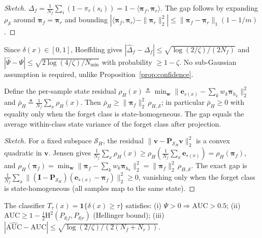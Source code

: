 \documentclass[smallextended]{svjour3}       %
\newcommand{\coloneqq}{\triangleq}
\begin{document}
\begin{proof}[Sketch]
$\Delta_f=\frac1{N_f}\sum_i(1-\pi_r(s_i))=1-\langle\boldsymbol{\pi}_f,\boldsymbol{\pi}_r\rangle$. The gap follows by expanding $\rho_{\mathcal{S}}$ around $\boldsymbol{\pi}_f=\boldsymbol{\pi}_r$ and bounding $|\langle\boldsymbol{\pi}_f,\boldsymbol{\pi}_r\rangle-\|\boldsymbol{\pi}_r\|_2^2|\le\|\boldsymbol{\pi}_f-\boldsymbol{\pi}_r\|_1(1-1/m)$.
\end{proof}

\begin{proposition}
\label{prop:pssd_conc}
Since $\delta(x)\in[0,1]$, Hoeffding gives $|\hat{\Delta}_f-\Delta_f|\le\sqrt{\log(2/\zeta)/(2N_f)}$ and $|\hat{\Psi}-\Psi|\le\sqrt{2\log(4/\zeta)/N_{\min}}$ with probability $\ge1-\zeta$. No sub-Gaussian assumption is required, unlike Proposition~\ref{prop:confidence}.
\end{proposition}

\begin{proposition}
\label{prop:ps_mhpr}
Define the per-sample state residual $\rho_H(x)\coloneqq\min_{\mathbf{w}}\|\mathbf{e}_{s(x)}-\sum_k w_k\boldsymbol{\pi}_{h_k}\|_2^2$ and $\bar{\rho}_H\coloneqq\frac1{N_f}\sum_x\rho_H(x)$. Then $\bar{\rho}_H \ge \|\boldsymbol{\pi}_f\|_2^2\,\rho_{H,\mathcal{S}}$; in particular $\bar{\rho}_H\ge0$ with equality only when the forget class is state-homogeneous. The gap equals the average within-class state variance of the forget class after projection.
\end{proposition}

\begin{proof}[Sketch]
For a fixed subspace $\mathcal{S}_H$, the residual $\|\mathbf{v}-\mathbf{P}_{\mathcal{S}_H}\mathbf{v}\|_2^2$ is a convex quadratic in $\mathbf{v}$. Jensen gives $\frac1{N_f}\sum_x\rho_H(x)\ge\rho_H(\frac1{N_f}\sum_x\mathbf{e}_{s(x)})=\rho_H(\boldsymbol{\pi}_f)$, and $\rho_H(\boldsymbol{\pi}_f)=\min_{\mathbf{w}}\|\boldsymbol{\pi}_f-\sum_k w_k\boldsymbol{\pi}_{h_k}\|_2^2=\|\boldsymbol{\pi}_f\|_2^2\,\rho_{H,\mathcal{S}}$. The exact gap is $\frac1{N_f}\sum_x\|(\mathbf{I}-\mathbf{P}_{\mathcal{S}_H})(\mathbf{e}_{s(x)}-\boldsymbol{\pi}_f)\|_2^2\ge0$, vanishing only when the forget class is state-homogeneous (all samples map to the same state).
\end{proof}

\begin{theorem}
\label{thm:pssd_mia}
The classifier $T_\tau(x)=\mathbf{1}\{\delta(x)\ge\tau\}$ satisfies: (i) $\Psi>0\Rightarrow\mathrm{AUC}>0.5$; (ii) $\mathrm{AUC}\ge1-\frac12\mathrm{H}^2(P_{\delta|f},P_{\delta|r})$ (Hellinger bound); (iii) $|\widehat{\mathrm{AUC}}-\mathrm{AUC}|\le\sqrt{\log(2/\zeta)/(2(N_f+N_r))}$.
\end{theorem}
\end{document}
